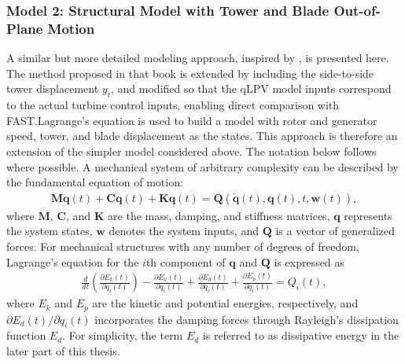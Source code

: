 \subsubsection{Model 2: Structural Model with Tower and Blade Out-of-Plane Motion} 
A similar but more detailed modeling approach, inspired by \cite{Bianchi2007}, is presented here. The method proposed in that book is extended by including the side-to-side tower displacement $y_t$, and modified so that the qLPV model inputs correspond to the actual turbine control inputs, enabling direct comparison with FAST.Lagrange's equation is used to build a model with rotor and generator speed, tower, and blade displacement as the states. This approach is therefore an extension of the simpler model considered above. The notation below follows \cite{Bianchi2007} where possible.
%
A mechanical system of arbitrary complexity can be described by the fundamental equation of motion:
\begin{align} \label{eqLagrange}
    \mathbf{M}\ddot{\bm{q}}(t) + \mathbf{C}\dot{\bm{q}}(t) + \mathbf{K}{\bm{q}}(t) = \mathbf{Q}(\dot{\bm{q}}(t), \bm{q}(t), t, \bm{w}(t)),
\end{align}
where $\mathbf{M}$, $\mathbf{C}$, and $\mathbf{K}$ are the mass, damping, and stiffness matrices, $\bm{q}$ represents the system states, $\bm{w}$ denotes the system inputs, and $\mathbf{Q}$ is a vector of generalized forces. For mechanical structures with any number of degrees of freedom, Lagrange's equation for the $i$th component of \(\bm{q}\) and \(\mathbf{Q}\) is expressed as
\begin{align*}
    \frac{d}{dt} \left(\frac{\partial E_k(t)}{\partial \dot{q}_i(t)} \right) - \frac{\partial E_k(t)}{\partial q_i(t)} + \frac{\partial E_d(t)}{\partial \dot{q}_i(t)} + \frac{\partial E_p(t)}{\partial q_i(t)} = Q_i(t),
\end{align*}
where \(E_k\) and \(E_p\) are the kinetic and potential energies, respectively, and $\partial E_d(t)/\partial \dot{q}_i(t)$ incorporates the damping forces through Rayleigh's dissipation function $E_d$. For simplicity, the term $E_d$ is referred to as dissipative energy in the later part of this thesis. %
